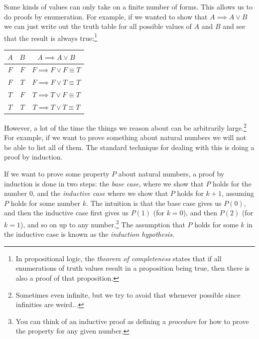 \documentclass{tufte-handout}
\newcounter{example}
\begin{document}
Some kinds of values can only take on a finite number of forms.
This allows us to do proofs by enumeration. For example, if we
wanted to show that $A \implies A \lor B$ we can just write out
the truth table for all possible values of $A$ and $B$ and see
that the result is always true:\footnote{In propositional logic,
  the \emph{theorem of completeness} states that if all
  enumerations of truth values result in a proposition being true,
  then there is also a proof of that proposition.}

\begin{tabular}{ccc}
  $A$&$B$&$A \implies A \lor B$\\
  \hline
  $F$ & $F$ & $F \implies F \lor F \equiv T$\\
  $F$ & $T$ & $F \implies F \lor T \equiv T$\\
  $T$ & $F$ & $T \implies T \lor F \equiv T$\\
  $T$ & $T$ & $T \implies T \lor T \equiv T$\\
\end{tabular}

However, a lot of the time the things we reason about can be
arbitrarily large.\footnote{Sometimes even infinite, but we try to
  avoid that whenever possible since infinities are weird...} For
example, if we want to prove something about natural numbers we
will not be able to list all of them. The standard technique for
dealing with this is doing a proof by induction.

If we want to prove some property $P$ about natural numbers, a
proof by induction is done in two steps: the \emph{base case},
where we show that $P$ holds for the number $0$, and the
\emph{inductive case} where we show that $P$ holds for $k + 1$,
assuming $P$ holds for some number $k$.
%
The intuition is that the base case gives us $P(0)$, and then the
inductive case first gives us $P(1)$ (for $k = 0$), and then
$P(2)$ (for $k = 1$), and so on up to any number.\footnote{You can
  think of an inductive proof as defining a \emph{procedure} for
  how to prove the property for any given number.}
%
The assumption that $P$ holds for some $k$ in the inductive case
is known as the \emph{induction hypothesis}.
\end{document}
